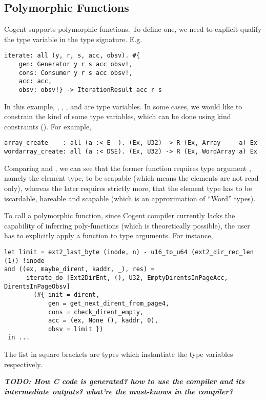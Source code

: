 \documentclass[a4paper]{article}
\newcommand{\TODO}[1]{\textbf{\textsl{TODO: #1}}}
\newcommand{\cogent}{Cogent\xspace}
\newcommand{\Cogent}{\cogent\xspace}
\begin{document}
\subsection{Polymorphic Functions}
\Cogent supports polymorphic functions. To define one, we need to explicit qualify the type variable
in the type signature. E.g.\
\begin{lstlisting}[language=Cogent]
iterate: all (y, r, s, acc, obsv). #{
	gen: Generator y r s acc obsv!,
	cons: Consumer y r s acc obsv!,
	acc: acc,
	obsv: obsv!} -> IterationResult acc r s
\end{lstlisting}
In this example, , , ,  and  are type variables. In some cases,
we would like to constrain the kind of some type variables, which can be done using kind constraints (\code{:<}).
For example, 
\begin{lstlisting}[language=Cogent]
array_create    : all (a :< E  ). (Ex, U32) -> R (Ex, Array     a) Ex
wordarray_create: all (a :< DSE). (Ex, U32) -> R (Ex, WordArray a) Ex
\end{lstlisting}
Comparing  and , we can see that the former function requires type argument
\code{a}, namely the element type, to be \code{E}scapable (which means the elements are not read-only), whereas 
the later requires strictly more, that the element type
has to be iscardable, hareable and scapable (which is an approximation of ``Word'' types).

To call a polymorphic function, since \cogent compiler currently lacks the capability of inferring poly-functions (which is
theoretically possible), the user has to explicitly apply a function to type arguments. For instance,
\begin{lstlisting}[language=Cogent]
let limit = ext2_last_byte (inode, n) - u16_to_u64 (ext2_dir_rec_len (1)) !inode
and ((ex, maybe_dirent, kaddr, _), res) = 
      iterate_do [Ext2DirEnt, (), U32, EmptyDirentsInPageAcc, DirentsInPageObsv]
        (#{ init = dirent,
            gen = get_next_dirent_from_page4,
            cons = check_dirent_empty,
            acc = (ex, None (), kaddr, 0),
            obsv = limit })
 in ...
\end{lstlisting}
The list in square brackets are types which instantiate the type variables respectively.

\TODO{How C code is generated? how to use the compiler and its intermediate outputs? what're the must-knows in the compiler?}
\end{document}
